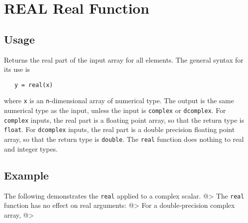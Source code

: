 \section{REAL Real Function}

\subsection{Usage}

Returns the real part of the input array for all elements.  The 
general syntax for its use is
\begin{verbatim}
   y = real(x)
\end{verbatim}
where \verb|x| is an \verb|n|-dimensional array of numerical type.  The output 
is the same numerical type as the input, unless the input is \verb|complex|
or \verb|dcomplex|.  For \verb|complex| inputs, the real part is a floating
point array, so that the return type is \verb|float|.  For \verb|dcomplex|
inputs, the real part is a double precision floating point array, so that
the return type is \verb|double|.  The \verb|real| function does
nothing to real and integer types.
\subsection{Example}

The following demonstrates the \verb|real| applied to a complex scalar.
@>
The \verb|real| function has no effect on real arguments:
@>
For a double-precision complex array,
@>
